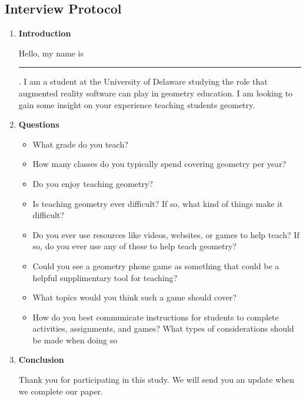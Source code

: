 \documentclass[manuscript, nonacm]{acmart}
\begin{document}
\begin{appendices}

  \section{Interview Protocol}
  \label{appendix:interview}
  \begin{enumerate}
  \item \textbf{Introduction}

    Hello, my name is \rule{1cm}{0.15mm}.  I am a student at the University of
    Delaware studying the role that augmented reality software can play in
    geometry education.  I am looking to gain some insight on your experience
    teaching students geometry.

  \item \textbf{Questions}

    \begin{itemize}
      \item What grade do you teach?
      \item How many classes do you typically spend covering geometry per year?
      \item Do you enjoy teaching geometry?
      \item Is teaching geometry ever difficult? If so, what kind of things make
        it difficult?
      \item Do you ever use resources like videos, websites, or games to help
        teach? If so, do you ever use any of these to help teach geometry?
      \item Could you see a geometry phone game as something that could be a
        helpful supplimentary tool for teaching?
      \item What topics would you think such a game should cover?
      \item How do you best communicate instructions for students to complete
        activities, assignments, and games? What types of considerations should
        be made when doing so
    \end{itemize}

  \item \textbf{Conclusion}

    Thank you for participating in this study. We will send you an update when we
    complete our paper.
  \end{enumerate}

  

\end{appendices}
\end{document}

